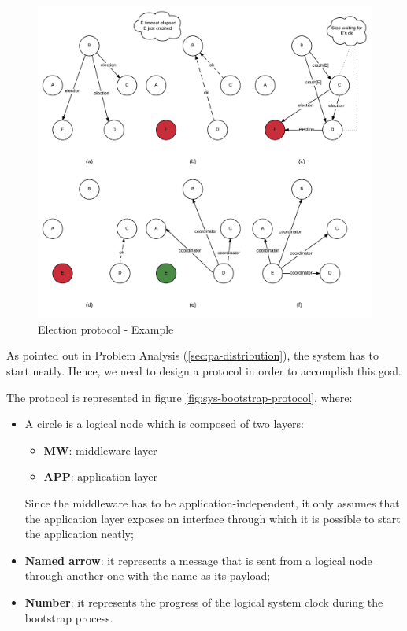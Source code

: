 \begin{figure}[H]
  \centering
  \includegraphics[width=\columnwidth]{sections/images/solution/election.pdf}
  \caption{Election protocol - Example}
  \label{fig:election-protocol-ex}
\end{figure}

As pointed out in Problem Analysis (\ref{sec:pa-distribution}), the system has
to start neatly. Hence, we need to design a protocol in order to accomplish 
this goal.

The protocol is represented in figure \ref{fig:sys-bootstrap-protocol}, where:

\begin{itemize}
  \item A circle is a logical node which is composed of two layers:
    \begin{itemize}
      \item \textbf{MW}:  middleware layer
      \item \textbf{APP}: application layer
  \end{itemize}
    Since the middleware has to be application-independent, it only assumes 
    that the application layer exposes an interface through which it is 
    possible to start the application neatly;
  \item \textbf{Named arrow}: it represents a message that is sent from a 
logical node through another one with the name as its payload;
  \item \textbf{Number}: it represents the progress of the logical system clock 
during the bootstrap process.
\end{itemize}

